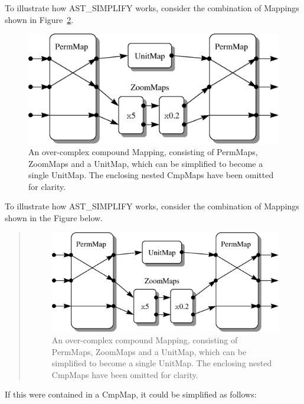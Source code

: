 \documentclass[twoside,11pt]{article}
\newenvironment{latexonly}{}{}
\newcommand{\htmlref}[2]{#1}
\begin{document}
\begin{latexonly}
   To illustrate how AST\_SIMPLIFY works, consider the combination of
   Mappings shown in Figure~\ref{fig:simplifyexample}.
   \begin{figure}
   \begin{center}
   \includegraphics[scale=0.65]{sun210_figures/simpexamp.eps}
   \caption{An over-complex compound \htmlref{Mapping}{Mapping}, consisting of PermMaps,
   ZoomMaps and a \htmlref{UnitMap}{UnitMap}, which can be simplified to become a single
   UnitMap.  The enclosing nested CmpMaps have been omitted for clarity.}
   \label{fig:simplifyexample}
   \end{center}
   \end{figure}
\end{latexonly}
\begin{htmlonly}
   To illustrate how AST\_SIMPLIFY works, consider the combination of
   Mappings shown in the Figure below.
   \begin{quote}
   \begin{figure}
   \label{fig:simplifyexample}
   \includegraphics[scale=1.1]{sun210_figures/simpexamp.eps}
   \caption{An over-complex compound Mapping, consisting of PermMaps,
   ZoomMaps and a UnitMap, which can be simplified to become a single
   UnitMap.  The enclosing nested CmpMaps have been omitted for clarity.}
   \end{figure}
   \end{quote}
\end{htmlonly}
If this were contained in a CmpMap, it could be simplified as follows:
\end{document}
